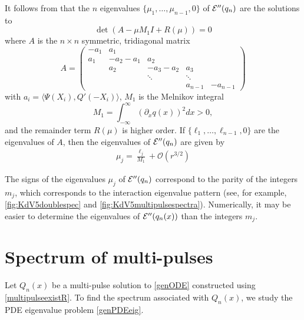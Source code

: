 \documentclass[thesis.tex]{subfiles}
\begin{document}
\begin{remark}\label{remark:Hessianeigs}
It follows from \cite{Sandstede1998} that the $n$ eigenvalues $\{ \mu_1, \dots, \mu_{n-1}, 0 \}$ of $\mathcal{E}''(q_n)$ are the solutions to 
\[
\det(A - \mu M_1 I + R(\mu)) = 0
\]
where $A$ is the $n \times n$ symmetric, tridiagonal matrix
\begin{equation}\label{nhomA}
A = \begin{pmatrix}
-a_1 & a_1 \\
a_1 & -a_2 - a_1 & a_2 \\
& a_2 & -a_3 - a_2 & a_3 \\
&& \ddots & \ddots \\
& & & a_{n-1} & -a_{n-1} 
\end{pmatrix}
\end{equation}
with $a_i = \langle \Psi(X_i), Q'(-X_i) \rangle$, $M_1$ is the Melnikov integral
\begin{equation}
M_1 = \int_{-\infty}^\infty \left( \partial_x q(x) \right)^2 dx > 0,
\end{equation}\label{nhomM1}
and the remainder term $R(\mu)$ is higher order. If $\{\ell_1, \dots, \ell_{n-1}, 0\}$ are the eigenvalues of $A$, then the eigenvalues of $\mathcal{E}''(q_n)$ are given by
\begin{align*}
\mu_j = \frac{\ell_j}{M_1} + \mathcal{O}(r^{3/2})
\end{align*}
\end{remark}

\begin{remark}
The signs of the eigenvalues $\mu_j$ of $\mathcal{E}''(q_n)$ correspond to the parity of the integers $m_j$, which corresponds to the interaction eigenvalue pattern (see, for example, \cref{fig:KdV5doublespec} and \cref{fig:KdV5multipulsespectra}). Numerically, it may be easier to determine the eigenvalues of $\mathcal{E}''(q_n(x))$ than the integers $m_j$.
\end{remark}

\section{Spectrum of multi-pulses}\label{sec:multispecR}

Let $Q_n(x)$ be a multi-pulse solution to \cref{genODE} constructed using \cref{multipulseexistR}. To find the spectrum associated with $Q_n(x)$, we study the PDE eigenvalue problem \cref{genPDEeig}. 
\end{document}
